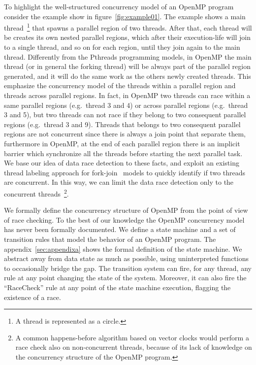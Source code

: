 To highlight the well-structured concurrency model of an OpenMP program
consider the example show in figure~\ref{fig:example01}.
%
The example shows a main thread~\footnote{A thread is represented as a
  circle.} that spawns a parallel region of two threads.
%
After that, each thread will be creates its own nested parallel regions, which
after their execution-life will join to a single thread, and so on for each
region, until they join again to the main thread.
%
Differently from the Pthreads programming models, in OpenMP the main thread
(or in general the forking thread) will be always part of the parallel region
generated, and it will do the same work as the others newly created threads.
%
This emphasize the concurrency model of the threads within a parallel region
and threads across parallel regions.
%
In fact, in OpenMP two threads can race within a same parallel regions (e.g.\
thread 3 and 4) or across parallel regions (e.g.\ thread 3 and 5), but two
threads can not race if they belong to two consequent parallel regions (e.g.\
thread 3 and 9).
%
Threads that belongs to two consequent parallel regions are not concurrent
since there is always a join point that separate them, furthermore in OpenMP,
at the end of each parallel region there is an implicit barrier which
synchronize all the threads before starting the next parallel task.
%
We base our idea of data race detection to these facts, and exploit an
existing thread labeling approach for
fork-join~\cite{Mellor-Crummey:1991:ODD:125826.125861} models to quickly
identify if two threads are concurrent.
%
In this way, we can limit the data race detection only to the concurrent
threads~\footnote{A common happens-before algorithm based on vector clocks
  would perform a race check also on non-concurrent threads, because of its
  lack of knowledge on the concurrency structure of the OpenMP program.}.

We formally define the concurrency structure of OpenMP from the point of view
of race checking.
%
To the best of our knowledge the OpenMP concurrency model has never been
formally documented.
%
We define a state machine and a set of transition rules that model the
behavior of an OpenMP program.                            
%
The appendix~\ref{sec:appendixa} shows the formal definition of the state
machine.
%
We abstract away from data state as much as possible, using uninterpreted
functions to occasionally bridge the gap.
%
The transition system can fire, for any thread, any rule at any point changing
the state of the system.
%
Moreover, it can also fire the ``RaceCheck'' rule at any point of the state
machine execution, flagging the existence of a race.

